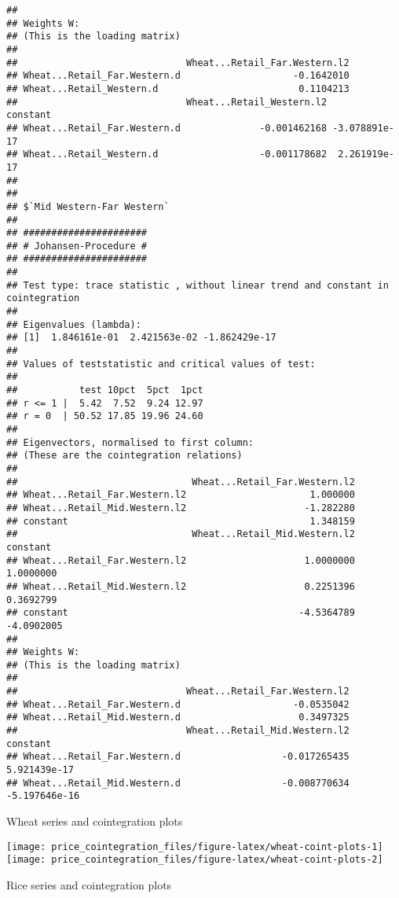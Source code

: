 \documentclass[12pt,]{article}
\begin{document}
\begin{verbatim}
## 
## Weights W:
## (This is the loading matrix)
## 
##                              Wheat...Retail_Far.Western.l2
## Wheat...Retail_Far.Western.d                    -0.1642010
## Wheat...Retail_Western.d                         0.1104213
##                              Wheat...Retail_Western.l2      constant
## Wheat...Retail_Far.Western.d              -0.001462168 -3.078891e-17
## Wheat...Retail_Western.d                  -0.001178682  2.261919e-17
## 
## 
## $`Mid Western-Far Western`
## 
## ###################### 
## # Johansen-Procedure # 
## ###################### 
## 
## Test type: trace statistic , without linear trend and constant in cointegration 
## 
## Eigenvalues (lambda):
## [1]  1.846161e-01  2.421563e-02 -1.862429e-17
## 
## Values of teststatistic and critical values of test:
## 
##           test 10pct  5pct  1pct
## r <= 1 |  5.42  7.52  9.24 12.97
## r = 0  | 50.52 17.85 19.96 24.60
## 
## Eigenvectors, normalised to first column:
## (These are the cointegration relations)
## 
##                               Wheat...Retail_Far.Western.l2
## Wheat...Retail_Far.Western.l2                      1.000000
## Wheat...Retail_Mid.Western.l2                     -1.282280
## constant                                           1.348159
##                               Wheat...Retail_Mid.Western.l2   constant
## Wheat...Retail_Far.Western.l2                     1.0000000  1.0000000
## Wheat...Retail_Mid.Western.l2                     0.2251396  0.3692799
## constant                                         -4.5364789 -4.0902005
## 
## Weights W:
## (This is the loading matrix)
## 
##                              Wheat...Retail_Far.Western.l2
## Wheat...Retail_Far.Western.d                    -0.0535042
## Wheat...Retail_Mid.Western.d                     0.3497325
##                              Wheat...Retail_Mid.Western.l2      constant
## Wheat...Retail_Far.Western.d                  -0.017265435  5.921439e-17
## Wheat...Retail_Mid.Western.d                  -0.008770634 -5.197646e-16
\end{verbatim}

Wheat series and cointegration plots

\begin{center}\texttt{[image: price\_cointegration\_files/figure-latex/wheat-coint-plots-1]} \texttt{[image: price\_cointegration\_files/figure-latex/wheat-coint-plots-2]} \end{center}

Rice series and cointegration plots
\end{document}
